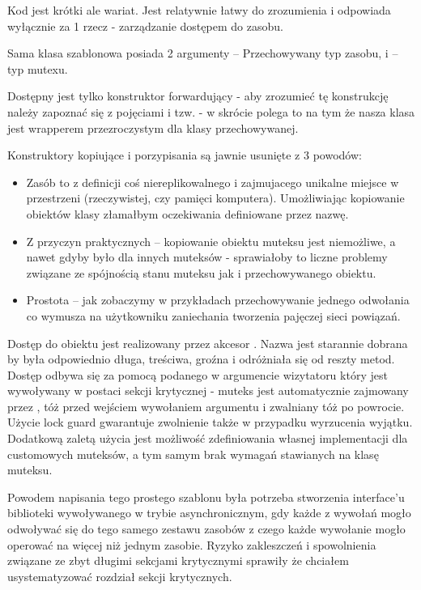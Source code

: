 
Kod jest krótki ale wariat. Jest relatywnie łatwy do zrozumienia i odpowiada wyłącznie za 1 rzecz - zarządzanie dostępem do zasobu.

Sama klasa szablonowa posiada 2 argumenty  -- Przechowywany typ zasobu, i  -- typ mutexu.

Dostępny jest tylko konstruktor forwardujący - aby zrozumieć tę konstrukcję należy zapoznać się z pojęciami  i tzw.  - w skrócie polega to na tym że nasza klasa  jest wrapperem przezroczystym dla klasy przechowywanej.

Konstruktory kopiujące i porzypisania są jawnie usunięte z 3 powodów:
\begin{itemize}
\item Zasób to z definicji coś niereplikowalnego i zajmujacego unikalne miejsce w przestrzeni (rzeczywistej, czy pamięci komputera). Umożliwiając kopiowanie obiektów klasy  złamałbym oczekiwania definiowane przez nazwę.
\item Z przyczyn praktycznych -- kopiowanie obiektu muteksu jest niemożliwe, a nawet gdyby było dla innych muteksów - sprawiałoby to liczne problemy związane ze spójnością stanu muteksu jak i przechowywanego obiektu.
\item Prostota -- jak zobaczymy w przykładach przechowywanie jednego odwołania co wymusza na użytkowniku zaniechania tworzenia pajęczej sieci powiązań.
\end{itemize}

Dostęp do obiektu jest realizowany przez akcesor . Nazwa jest starannie dobrana by była odpowiednio długa, treściwa, groźna i odróżniała się od reszty metod. Dostęp odbywa się za pomocą podanego w argumencie wizytatoru który jest wywoływany w postaci sekcji krytycznej - muteks jest automatycznie zajmowany przez , tóż przed wejściem wywołaniem argumentu i zwalniany tóż po powrocie. Użycie lock guard gwarantuje zwolnienie także w przypadku wyrzucenia wyjątku. Dodatkową zaletą użycia  jest możliwość zdefiniowania własnej implementacji dla customowych muteksów, a tym samym brak wymagań stawianych na klasę muteksu.

Powodem napisania tego prostego szablonu była potrzeba stworzenia interface'u biblioteki wywoływanego w trybie asynchronicznym, gdy każde z wywołań mogło odwoływać się do tego samego zestawu zasobów z czego każde wywołanie mogło operować na więcej niż jednym zasobie. Ryzyko zakleszczeń i spowolnienia związane ze zbyt długimi sekcjami krytycznymi sprawiły że chciałem usystematyzować rozdział sekcji krytycznych.
